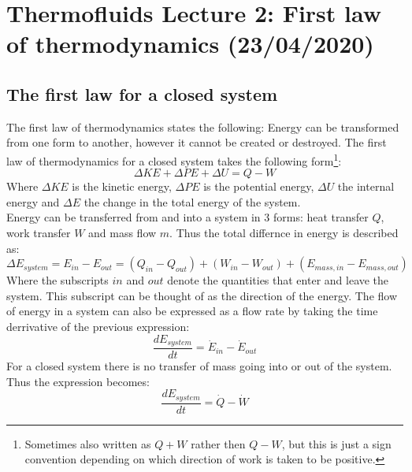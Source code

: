 \documentclass[11pt, a4paper]{article}
\begin{document}
\setcounter{section}{1}
\setcounter{equation}{0}

\section{Thermofluids Lecture 2: First law of thermodynamics (23/04/2020)}


\subsection{The first law for a closed system}
The first law of thermodynamics states the following: Energy can be transformed from one form to another, however it cannot be created or destroyed. The first law of thermodynamics for a closed system takes the following form\footnote{Sometimes also written as $Q + W$ rather then $Q - W$, but this is just a sign convention depending on which direction of work is taken to be positive.}:
\begin{equation}
  \Delta KE + \Delta PE + \Delta U = Q - W
\end{equation}
Where $\Delta KE$ is the kinetic energy, $\Delta PE$ is the potential energy, $\Delta U$ the internal energy and $\Delta E$ the change in the total energy of the system.\\
Energy can be transferred from and into a system in 3 forms: heat transfer $Q$, work transfer $W$ and mass flow $m$. Thus the total differnce in energy is described as:
\begin{equation}
  \Delta E_{system} = E_{in} - E_{out} = (Q_{in} - Q_{out}) + (W_{in} - W_{out}) + (E_{mass,in} - E_{mass,out})
\end{equation}
Where the subscripts $in$ and $out$ denote the quantities that enter and leave the system. This subscript can be thought of as the direction of the energy. The flow of energy in a system can also be expressed as a flow rate by taking the time derrivative of the previous expression:
\begin{equation}
  \frac{dE_{system}}{dt} = \dot{E}_{in} - \dot{E}_{out}
\end{equation}
For a closed system there is no transfer of mass going into or out of the system. Thus the expression becomes:
\begin{equation}
  \frac{dE_{system}}{dt} = \dot{Q} - \dot{W}
\end{equation}
\end{document}

